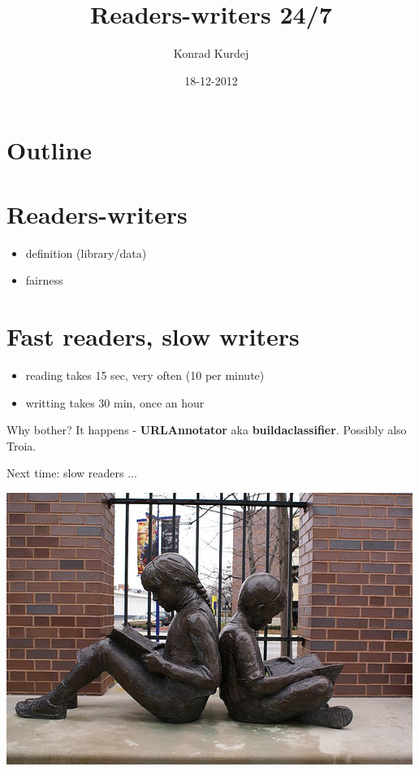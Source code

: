 \documentclass{beamer}
\title{Readers-writers 24/7}
\author{Konrad Kurdej}
\date{18-12-2012}
\begin{document}
\begin{frame}
\titlepage
\end{frame}
\section*{Outline}
\begin{frame}
\tableofcontents
\end{frame}

\section{Readers-writers}
\begin{frame}
\begin{itemize}
 \item definition (library/data)
 \item fairness
\end{itemize}
\end{frame}


\section{Fast readers, slow writers}
\begin{frame}
\begin{itemize}
 \item reading takes 15 sec, very often (10 per minute)
 \item writting takes 30 min, once an hour
\end{itemize}
\pause
\begin{block}{Why bother?}
\pause
It happens - \textbf{URLAnnotator} aka \textbf{buildaclassifier}.
Possibly also Troia.
\end{block}
\end{frame}

\begin{frame}

Next time: slow readers ...

\begin{center}
\includegraphics[scale=0.5]{slow_readers.jpg} 

\end{center}
\end{frame}
\end{document}

